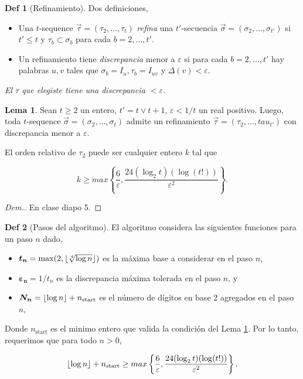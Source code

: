 \documentclass{report}
\theoremstyle{definition} %
\newtheorem{lemma}{Lema}[chapter]
\newtheorem*{definition*}{Def}
\DeclarePairedDelimiter\floor{\lfloor}{\rfloor}
\newcommand{\sigmatsequence}{\overset{\rightarrow}{\sigma}}
\newcommand{\tautsequence}{\overset{\rightarrow}{\tau}}
\begin{document}
\begin{definition*}[Refinamiento]
    Dos definiciones,

    \begin{itemize}
        \item Una $t$-sequence $\overset{\rightarrow}{\tau} = (\tau_2, \dots,
        \tau_t)$ \textit{refina} una $t'$-secuencia $\sigmatsequence = (\sigma_2,
        \dots, \sigma_{t'})$ si $t' \leq t$ y $\tau_b \subset \sigma_b$ para cada
        $b = 2, \dots, t'$.

        \item Un refinamiento tiene \textit{discrepancia} menor a $\varepsilon$
        si para cada $b = 2, \dots, t'$ hay palabras $u, v$ tales que $\sigma_b
        = I_u, \tau_b = I_{uv}$ y $\Delta(v) < \varepsilon$.
    \end{itemize}
    

    \textit{El $\tau$ que elegiste tiene una discrepancia $< \varepsilon$.}
\end{definition*}

\begin{lemma}\label{lemma:bhs-refinement}
    Sean $t \geq 2$ un entero, $t' = t \vee t + 1$, $\varepsilon < 1/t$ un real
    positivo. Luego, toda $t$-sequence $\sigmatsequence = (\sigma_2, \dots,
    \sigma_t)$ admite un refinamiento $\tautsequence = (\tau_2, \dots,
    tau_{t'})$ con discrepancia menor a $\varepsilon$.

    El orden relativo de $\tau_2$ puede ser cualquier entero $k$ tal que
    
    \[
        k \geq max
        \left\{
            \frac{6}{\varepsilon},
            \frac{24(\log_2 t)(\log(t!))}{\varepsilon^2}
        \right\}.
    \]
\end{lemma}
\begin{proof}[Dem.]
    En clase diapo 5.
\end{proof}

\begin{definition*}[Pasos del algoritmo]
    El algoritmo considera las siguientes funciones para un paso $n$ dado,
    
    \begin{itemize}
        \item[] $\bm{t_n} = \max(2, \floor{\sqrt[4]{\log n}})$ es la máxima base
        a considerar en el paso $n$,
        \item[] $\bm{\varepsilon_n} = 1/t_n$ es la discrepancia máxima tolerada
        en el paso $n$, y
        \item[] $\bm{N_n} = \floor{\log n} + n_{\text{start}}$ es el número de
        dígitos en base 2 agregados en el paso $n$,
    \end{itemize}

    Donde $n_{\text{start}}$ es el minimo entero que valida la condición del
    Lema \ref{lemma:bhs-refinement}. Por lo tanto, requerimos que para todo $n >
    0$,
    
    \[
        \floor{\log n} + n_{\text{start}} \geq max
        \left\{
            \frac{6}{\varepsilon},
            \frac{24(\log_2 t)(\log(t!))}{\varepsilon^2}
        \right\}.
    \]
    
\end{definition*}
\end{document}
